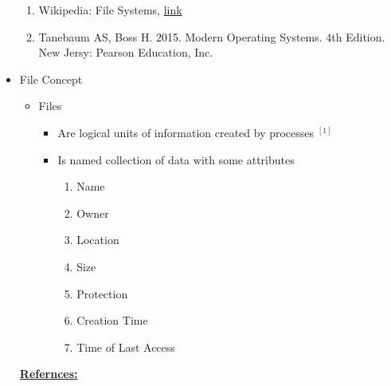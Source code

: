 \documentclass[12pt]{article}
\begin{document}
\begin{itemize}
    \begin{enumerate}[1)]
        \item Wikipedia: File Systems, \href{https://en.wikipedia.org/wiki/Paging}{link}
        \item Tanebaum AS, Boss H. 2015. Modern Operating Systems. 4th Edition. New Jersy: Pearson Education, Inc.
    \end{enumerate}
    \item File Concept
    \begin{itemize}
        \item Files
        \begin{itemize}
            \item Are logical units of information created by processes $^{[1]}$
            \item Is named collection of data with some attributes
            \begin{enumerate}[1.]
                \item Name
                \item Owner
                \item Location
                \item Size
                \item Protection
                \item Creation Time
                \item Time of Last Access
            \end{enumerate}
        \end{itemize}

    \end{itemize}

    \bigskip

    \underline{\textbf{Refernces:}}

    \bigskip


\end{itemize}
\end{document}
